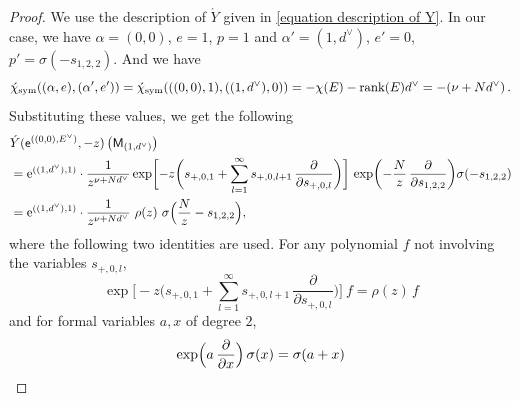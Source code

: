 \documentclass[11pt]{amsart}
\theoremstyle{remark}
\newcommand{\p}{\partial}
\newcommand{\rk}{\textnormal{rank}}
\newcommand{\sym}{\textnormal{sym}}
\newcommand{\sfM}{\mathsf M}
\newcommand{\ex}{\textnormal{e}}
\newcommand{\du}{d^\vee}
\numberwithin{theorem}{section}
\begin{document}
\begin{proof}
We use the description of $\acute{Y}$ given in \eqref{equation description of Y}.
In our case, we have $\alpha=(0,0)$, $e=1$, $p=1$ and $\alpha'=(1,\du)$, $e'=0$, $p'= \sigma(-s_{1,2,2})$.
And we have 
$$\acute{\chi}_{\sym}((\alpha,e),(\alpha',e')) =
\acute{\chi}_{\sym}(((0,0),1),((1,\du),0)) = 
-\chi(E)-\rk(E)\du = -(\nu+N\du) \,.$$
Substituting these values, we get the following
\begin{align*}
        & \acute{Y} (\mathsf e^{((0,0),E^\vee)}, -z) \left(\sfM_{(1,\du)}\right) \\
        & = {}
        \ex^{((1,\du),1)} \cdot \frac{1}{z^{\nu+N\du}}
        \exp \biggl[ -z \biggl(s_{{+},0,1} +
            \sum_{l=1}^{\infty} s_{{+},0,l+1} \,
            \frac{\p}{\p s_{+,0,l}}
        \biggr) \biggr] 
        \, \exp \biggl( -\frac{N}{z} \, \frac{\p}{\p s_{1,2,2}} \biggr) 
        \sigma (-s_{1,2,2}) \\
        & = {}
        \ex^{((1,\du),1)} \cdot \frac{1}{z^{\nu+N\du}} \
        \rho (z) \ \sigma \Bigl( \frac{N}{z} - s_{1,2,2} \Bigr),
    \end{align*}
    where the following two identities are used.
    For any polynomial $f$ not involving the variables $s_{{+},0,l}$,
    \begin{equation*}
        \exp \biggl[ -z \biggl(
            s_{{+},0,1} +
            \sum_{l=1}^{\infty} s_{{+},0,l+1} \,
            \frac{\p}{\p s_{{+},0,l}}
        \biggr) \biggr] \ f =
        \rho (z) \, f
    \end{equation*}
    and for formal variables $a, x$ of degree $2$,
    \begin{equation*}
        \exp \Bigl( a \, \frac{\p}{\p x} \Bigr)
        \, \sigma (x) = \sigma (a + x)
    \end{equation*}
\end{proof}
\end{document}
